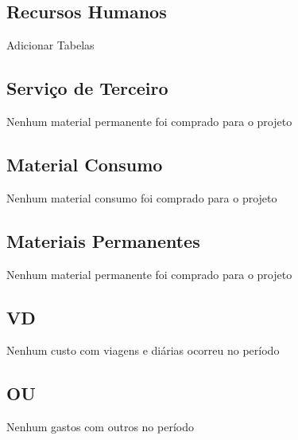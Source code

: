 \vfill

\newpage

\subsection{Recursos Humanos}

Adicionar Tabelas 

\subsection{Serviço de Terceiro}
Nenhum material permanente foi comprado para o projeto

\subsection{Material Consumo}
Nenhum material consumo foi comprado para o projeto

\subsection{Materiais Permanentes}
Nenhum material permanente foi comprado para o projeto

\subsection{VD}
Nenhum custo com viagens e diárias ocorreu no período 

\subsection{OU}
Nenhum gastos com outros no período




